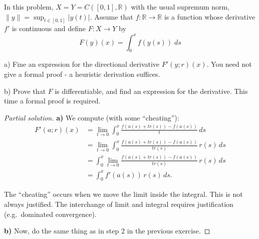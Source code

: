 \begin{prob}
    In this problem, $X = Y = C([0,1], \mathbb R)$ with 
    the usual supremum norm, $\|y\| = \sup_{t\in[0,1]}|y(t)|$. 
    Assume that $f : \mathbb R \to \mathbb R$ is a function 
    whose derivative $f'$ is continuous and define 
    $F : X \to Y$ by
    \[
        F(y)(x) = \displaystyle\int_{0}^{x}f(y(s)) \; ds
    \]

    a) Fine an expression for the directional derivative $F'(y;r)(x)$.
    You need not give a formal proof - a heuristic derivation 
    suffices. 

    b) Prove that $F$ is differentiable, and find an 
    expression for the derivative. This time a formal proof 
    is required.
\end{prob}
\begin{proof}[Partial solution]
    \textbf{a)} We compute (with some ``cheating''):
    \begin{align*}
        F'(a; r)(x)
&= \lim_{t \to 0} \int_0^x \frac{f(a(s) + t r(s)) - f(a(s))}{t} 
\, ds \\[6pt]
&= \lim_{t \to 0} \int_0^x 
\frac{f(a(s) + t r(s)) - f(a(s))}{t r(s)} \, r(s)\, ds \\[6pt]
&= \int_0^x \lim_{t \to 0} 
\frac{f(a(s) + t r(s)) - f(a(s))}{t r(s)} \, r(s)\, ds \\[6pt]
&= \int_0^x f'(a(s))\, r(s)\, ds.
    \end{align*}

    The ``cheating'' occurs when we move the limit inside the 
    integral. This is not always justified.
    The interchange of limit and integral requires justification 
    (e.g.\ dominated convergence).

    \medskip
    \noindent
    \textbf{b)} Now, do the same thing as in step 2 in the 
    previous exercise.
\end{proof}

